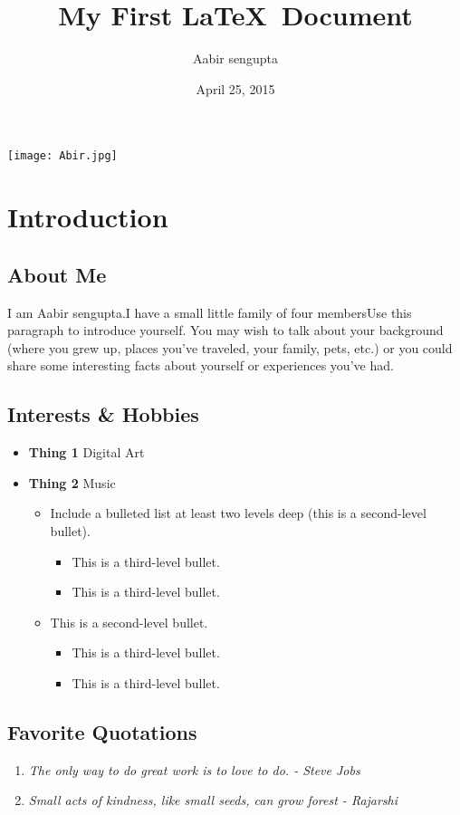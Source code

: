 \documentclass[12pt]{article}
\title{My First \LaTeX\ Document}
\author{Aabir sengupta}
\date{April 25, 2015}
\begin{document}
\maketitle
\begin{center}
    \texttt{[image: Abir.jpg]}
\end{center}
\section{Introduction}
\subsection{About Me}
I am Aabir sengupta.I have a small little family of four membersUse this paragraph to introduce yourself. You may wish to talk about your background (where you grew up, places you’ve traveled, your family, pets, etc.) or you could share some interesting facts about yourself or experiences you’ve had.
\subsection{Interests \& Hobbies}
\begin{itemize}
    \item \textbf{Thing 1} Digital Art
    \item \textbf{Thing 2} Music
    \begin{itemize}
        \item Include a bulleted list at least two levels deep (this is a second-level bullet).
        \begin{itemize}
            \item This is a third-level bullet.
            \item This is a third-level bullet.
        \end{itemize}
        \item This is a second-level bullet.
        \begin{itemize}
            \item This is a third-level bullet.
            \item This is a third-level bullet.
        \end{itemize}
    \end{itemize}
\end{itemize}
\subsection{Favorite Quotations}
\begin{enumerate}
    \item \textit{The only way to do great work is to love to do. - Steve Jobs}
    \item \textit{Small acts of kindness, like small seeds, can grow forest - Rajarshi }
\newpage
\end{enumerate}
\end{document}
